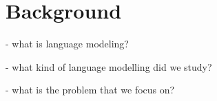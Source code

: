 \section{Background}
\label{background}

- what is language modeling?

- what kind of language modelling did we study?

- what is the problem that we focus on?
